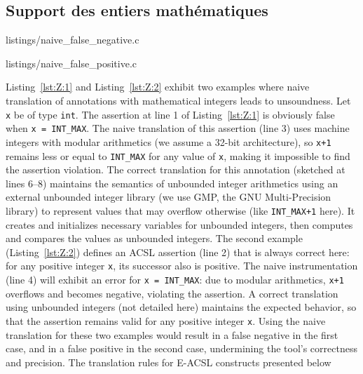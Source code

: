 \subsection{Support des entiers mathématiques}\label{sec:integers}



                {listings/naive_false_negative.c}


                {listings/naive_false_positive.c}


Listing~\ref{lst:Z:1} and Listing~\ref{lst:Z:2} exhibit two examples where 
naive translation of annotations with mathematical integers leads to unsoundness.
 Let  \lstinline'x' be of type \lstinline'int'.
The assertion at line 1 of Listing~\ref{lst:Z:1}
is obviously false when \lstinline'x = INT_MAX'. 
The naive translation of this assertion
(line 3) uses machine integers with modular arithmetics
(we assume a 32-bit architecture), so 
\lstinline'x+1' remains less or equal to \lstinline'INT_MAX' for any value of
\lstinline'x', making it impossible to find the assertion violation.
The correct translation for this annotation
(sketched at lines 6--8) maintains the semantics of unbounded integer arithmetics
using an external unbounded integer library (we use GMP, the GNU Multi-Precision library)
to represent values that may overflow otherwise (like
\lstinline'INT_MAX+1' here).
It creates and initializes necessary variables for unbounded integers,
then computes and compares the values as unbounded integers.
The second example (Listing~\ref{lst:Z:2}) defines an ACSL assertion
(line 2) that is always correct here: for any positive integer \lstinline'x',
its successor also is positive. The naive instrumentation
(line 4) will exhibit an error for \lstinline'x = INT_MAX':
due to modular arithmetics, \lstinline'x+1' overflows and becomes negative,
violating the assertion. A correct translation using unbounded integers 
(not detailed here)
maintains the expected behavior, so that the assertion remains valid for any positive integer
\lstinline'x'.
Using the naive translation for these two examples would result in a
false negative in the first case, and in a false positive in the second case,
undermining the tool's correctness and precision.
The translation rules for E-ACSL constructs %
presented below %
